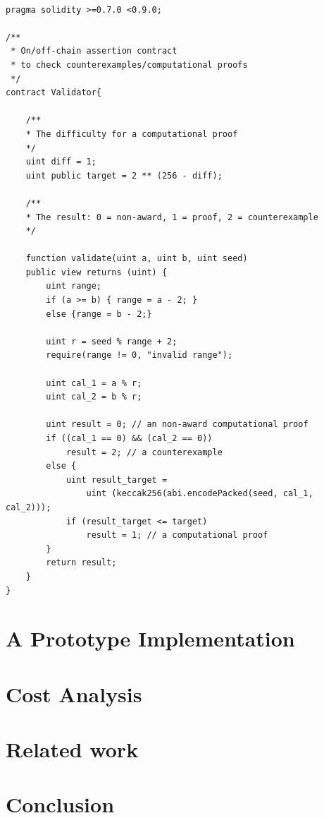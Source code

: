 \documentclass[runningheads]{llncs}
\begin{document}
\begin{lstlisting}[numbers=none]

pragma solidity >=0.7.0 <0.9.0;

/**
 * On/off-chain assertion contract 
 * to check counterexamples/computational proofs
 */
contract Validator{

    /**
    * The difficulty for a computational proof
    */
    uint diff = 1;
    uint public target = 2 ** (256 - diff); 

    /**
    * The result: 0 = non-award, 1 = proof, 2 = counterexample
    */

    function validate(uint a, uint b, uint seed)
    public view returns (uint) {
        uint range;
        if (a >= b) { range = a - 2; }
        else {range = b - 2;}
        
        uint r = seed % range + 2;
        require(range != 0, "invalid range");

        uint cal_1 = a % r;
        uint cal_2 = b % r;

        uint result = 0; // an non-award computational proof 
        if ((cal_1 == 0) && (cal_2 == 0))  
            result = 2; // a counterexample
        else {
            uint result_target = 
                uint (keccak256(abi.encodePacked(seed, cal_1, cal_2)));
            if (result_target <= target) 
                result = 1; // a computational proof      
        }              
        return result;           
    }
}

\end{lstlisting}

\section{A Prototype Implementation}
\section{Cost Analysis}
\section{Related work}
\section{Conclusion}

\newpage
{}


\newpage


\end{document}
